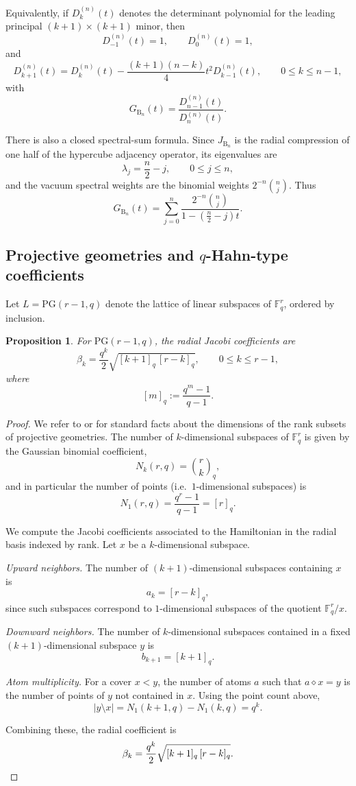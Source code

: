 \documentclass[11pt]{amsart}
\newtheorem{prop}[thm]{Proposition}
\theoremstyle{definition}
\newcommand{\bb}{\mathbb}
\newcommand{\PG}{\mathrm{PG}}
\newcommand{\BB}{\mathrm{B}}
\begin{document}
Equivalently, if $D^{(n)}_k(t)$ denotes the determinant polynomial for the leading principal
$(k+1)\times (k+1)$ minor, then
\[
D^{(n)}_{-1}(t)=1,\qquad D^{(n)}_0(t)=1,
\]
and
\[
D^{(n)}_{k+1}(t)=D^{(n)}_k(t)-\frac{(k+1)(n-k)}{4}t^2 D^{(n)}_{k-1}(t),
\qquad 0\le k\le n-1,
\]
with
\[
G_{\BB_n}(t)=\frac{D^{(n)}_{n-1}(t)}{D^{(n)}_n(t)}.
\]

There is also a closed spectral-sum formula.  Since $J_{\BB_n}$ is the radial compression of one half of the hypercube adjacency operator, its eigenvalues are
\[
\lambda_j=\frac{n}{2}-j,
\qquad 0\le j\le n,
\]
and the vacuum spectral weights are the binomial weights $2^{-n}\binom{n}{j}$.  Thus
\[
G_{\BB_n}(t)
=
\sum_{j=0}^{n}
\frac{2^{-n}\binom{n}{j}}{1-\left(\frac{n}{2}-j\right)t}.
\]



\subsection{Projective geometries and $q$-Hahn-type coefficients}

Let $L=\PG(r-1,q)$ denote the lattice of linear subspaces of $\bb F_q^r$, ordered by inclusion.

\begin{prop}
For $\PG(r-1,q)$, the radial Jacobi coefficients are
\[
\beta_k=\frac{q^k}{2}\sqrt{[k+1]_q\,[r-k]_q},
\qquad 0\le k\le r-1,
\]
where
\[
[m]_q:=\frac{q^m-1}{q-1}.
\]
\end{prop}

\begin{proof}
We refer to \cite[Section 1.4]{Dembowski} or \cite{Hirschfeld} for standard facts about the dimensions of the rank subsets of projective geometries. The number of $k$-dimensional subspaces of $\mathbb{F}_q^r$ is given by the Gaussian binomial coefficient,
\[
N_k(r,q)=\binom{r}{k}_q,
\]
and in particular the number of points (i.e.\ $1$-dimensional subspaces) is
\[
N_1(r,q)=\frac{q^r-1}{q-1} = [r]_q.
\]

We compute the Jacobi coefficients associated to the Hamiltonian in the radial basis indexed by rank. Let $x$ be a $k$-dimensional subspace.

\medskip

\noindent\emph{Upward neighbors.}
The number of $(k+1)$-dimensional subspaces containing $x$ is
\[
a_k = [r-k]_q,
\]
since such subspaces correspond to $1$-dimensional subspaces of the quotient $\mathbb F_q^r/x$.

\medskip

\noindent
\emph{Downward neighbors.}
The number of $k$-dimensional subspaces contained in a fixed $(k+1)$-dimensional subspace $y$ is
\[
b_{k+1} = [k+1]_q.
\]

\medskip

\noindent
\emph{Atom multiplicity.}
For a cover $x<y$, the number of atoms $a$ such that $a\diamond x=y$ is the number of points of $y$ not contained in $x$. Using the point count above,
\[
|y\setminus x|
=
N_1(k+1,q)-N_1(k,q)
=
q^k.
\]

\medskip

Combining these, the radial coefficient is
\[
\beta_k
=
\frac{q^k}{2}\sqrt{[k+1]_q\,[r-k]_q}. \qedhere
\]
\end{proof}
\end{document}
